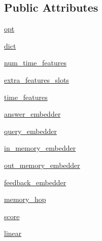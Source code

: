 \subsection*{Public Attributes}
\begin{DoxyCompactItemize}
\item 
\hyperlink{classprojects_1_1memnn__feedback_1_1agent_1_1modules_1_1MemNN_ad5ca60da96aa65443275f7702521ed4d}{opt}
\item 
\hyperlink{classprojects_1_1memnn__feedback_1_1agent_1_1modules_1_1MemNN_a279bdfa31d5bccc5853f884ed77ed926}{dict}
\item 
\hyperlink{classprojects_1_1memnn__feedback_1_1agent_1_1modules_1_1MemNN_a8d9bfcf4b02648bdefffbb35a67ec3a4}{num\+\_\+time\+\_\+features}
\item 
\hyperlink{classprojects_1_1memnn__feedback_1_1agent_1_1modules_1_1MemNN_a08af320f92fbfdde82c829faf05b0b00}{extra\+\_\+features\+\_\+slots}
\item 
\hyperlink{classprojects_1_1memnn__feedback_1_1agent_1_1modules_1_1MemNN_aff8215d7fa779781c3682edb2340635d}{time\+\_\+features}
\item 
\hyperlink{classprojects_1_1memnn__feedback_1_1agent_1_1modules_1_1MemNN_ac1ace4846a98bc2613e2226235254002}{answer\+\_\+embedder}
\item 
\hyperlink{classprojects_1_1memnn__feedback_1_1agent_1_1modules_1_1MemNN_aeb1e5ad8ac6c3cc7687a05ea6cc6ef12}{query\+\_\+embedder}
\item 
\hyperlink{classprojects_1_1memnn__feedback_1_1agent_1_1modules_1_1MemNN_a6cac60c32ed054e5f523ccc82a5bd482}{in\+\_\+memory\+\_\+embedder}
\item 
\hyperlink{classprojects_1_1memnn__feedback_1_1agent_1_1modules_1_1MemNN_a28a55e000d703f0c3763d30cc598795f}{out\+\_\+memory\+\_\+embedder}
\item 
\hyperlink{classprojects_1_1memnn__feedback_1_1agent_1_1modules_1_1MemNN_a9a6bee0a069d3ea39f2828b2144019b4}{feedback\+\_\+embedder}
\item 
\hyperlink{classprojects_1_1memnn__feedback_1_1agent_1_1modules_1_1MemNN_a6e377f7974f4db3e0c17fd1bfcd4b483}{memory\+\_\+hop}
\item 
\hyperlink{classprojects_1_1memnn__feedback_1_1agent_1_1modules_1_1MemNN_ad2475ec45a3691424e6b214740f4ead2}{score}
\item 
\hyperlink{classprojects_1_1memnn__feedback_1_1agent_1_1modules_1_1MemNN_a83cf9a54d8c7e5203360c6e59cfa2462}{linear}
\end{DoxyCompactItemize}


